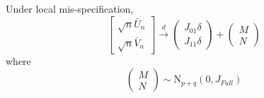 \begin{lem}
\label{lem:score}
Under local mis-specification,
$$\left[\begin{array}{c}
\sqrt{n} \bar{U}_n \\ \sqrt{n} \bar{V}_n
\end{array}\right] \overset{d}{\rightarrow}
\left(\begin{array}{c}
J_{01}\delta\\
J_{11}\delta
\end{array}\right) +
\left(\begin{array}{c}
M\\
N
\end{array}\right)$$
where
$$\left(\begin{array}{c}
M\\
N
\end{array}\right) \sim \mbox{N}_{p+q}(0, J_{Full})$$
\end{lem}
